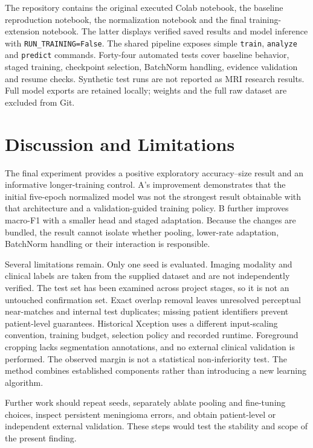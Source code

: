 \documentclass[11pt,a4paper]{article}
\begin{document}
The repository contains the original executed Colab notebook, the baseline
reproduction notebook, the normalization notebook and the final training-extension
notebook. The latter displays verified saved results and model inference with
\texttt{RUN\_TRAINING=False}. The shared pipeline exposes simple \texttt{train},
\texttt{analyze} and \texttt{predict} commands. Forty-four automated tests cover
baseline behavior, staged training, checkpoint selection, BatchNorm handling,
evidence validation and resume checks. Synthetic test runs are not reported as
MRI research results. Full model exports are retained locally; weights and the
full raw dataset are excluded from Git.
\FloatBarrier

\section{Discussion and Limitations}
The final experiment provides a positive exploratory accuracy--size result and
an informative longer-training control. A's improvement demonstrates that the
initial five-epoch normalized model was not the strongest result obtainable
with that architecture and a validation-guided training policy. B further
improves macro-F1 with a smaller head and staged adaptation. Because the changes
are bundled, the result cannot isolate whether pooling, lower-rate adaptation,
BatchNorm handling or their interaction is responsible.

Several limitations remain. Only one seed is evaluated. Imaging modality and
clinical labels are taken from the supplied dataset and are not independently
verified. The test set has been
examined across project stages, so it is not an untouched confirmation set.
Exact overlap removal leaves unresolved perceptual near-matches and internal
test duplicates; missing patient identifiers prevent patient-level guarantees.
Historical Xception uses a different input-scaling convention, training budget,
selection policy and recorded runtime. Foreground cropping lacks segmentation annotations, and no
external clinical validation is performed. The observed margin is not a
statistical non-inferiority test. The method combines established components
rather than introducing a new learning algorithm.

Further work should repeat seeds, separately ablate pooling and fine-tuning
choices, inspect persistent meningioma errors, and obtain patient-level or
independent external validation. These steps would test the stability and scope
of the present finding.
\end{document}
